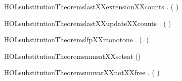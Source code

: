 \begin{SaveVerbatim}{HOLsubstitutionTheoremslastXXextensionXXcounts}
\HOLTokenTurnstile{} \HOLSymConst{\HOLTokenForall{}}   .
        (   ) \HOLSymConst{=}    
\end{SaveVerbatim}
\newcommand{\HOLsubstitutionTheoremslastXXextensionXXcounts}{\UseVerbatim{HOLsubstitutionTheoremslastXXextensionXXcounts}}
\begin{SaveVerbatim}{HOLsubstitutionTheoremslastXXupdateXXcounts}
\HOLTokenTurnstile{} \HOLSymConst{\HOLTokenForall{}}   .   (   )  \HOLSymConst{=}    
\end{SaveVerbatim}
\newcommand{\HOLsubstitutionTheoremslastXXupdateXXcounts}{\UseVerbatim{HOLsubstitutionTheoremslastXXupdateXXcounts}}
\begin{SaveVerbatim}{HOLsubstitutionTheoremslfpXXmonotone}
\HOLTokenTurnstile{} \HOLSymConst{\HOLTokenForall{}} . (\HOLSymConst{\HOLTokenForall{}}.   \HOLConst{\HOLTokenSubset{}}  ) \HOLSymConst{\HOLTokenImp{}}   \HOLConst{\HOLTokenSubset{}}  
\end{SaveVerbatim}
\newcommand{\HOLsubstitutionTheoremslfpXXmonotone}{\UseVerbatim{HOLsubstitutionTheoremslfpXXmonotone}}
\begin{SaveVerbatim}{HOLsubstitutionTheoremsmmsatXXsetsat}
\HOLTokenTurnstile{} (\HOLSymConst{,}\HOLSymConst{,})   \HOLSymConst{\HOLTokenEquiv{}}  \HOLConst{\HOLTokenIn{}}    
\end{SaveVerbatim}
\newcommand{\HOLsubstitutionTheoremsmmsatXXsetsat}{\UseVerbatim{HOLsubstitutionTheoremsmmsatXXsetsat}}
\begin{SaveVerbatim}{HOLsubstitutionTheoremsmuvarXXnotXXfree}
\HOLTokenTurnstile{} \HOLSymConst{\HOLTokenForall{}} .  \HOLConst{\HOLTokenNotIn{}}  (  )
\end{SaveVerbatim}
